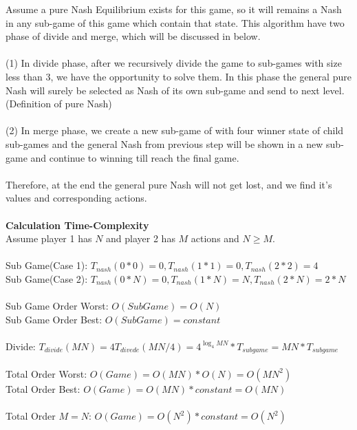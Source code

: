 \documentclass[
  course = {{IE579 Game Theory and Multi-Agent Reinforcement Learning}},
  assignment = 1,
  name = {{Mohammad Mahdi Rahimi}},
  studentnumber = {{20208244}},
  email = {{mahi@kaist.ac.kr}},
  firstexercise = 1
]{aga-homework}
\begin{document}
\proof Assume a pure Nash Equilibrium exists for this game, so it will remains a Nash in any sub-game of this game which contain that state. This algorithm have two phase of divide and merge, which will be discussed in below.\\\\
(1) In divide phase, after we recursively divide the game to sub-games with size less than 3, we have the opportunity to solve them. In this phase the general pure Nash will surely be selected as Nash of its own sub-game and send to next level. (Definition of pure Nash)
\\\\
(2) In merge phase, we create a new sub-game of with four winner state of child sub-games and the general Nash from previous step will be shown in a new sub-game and continue to winning till reach the final game.
\\\\
Therefore, at the end the general pure Nash will not get lost, and we find it's values and corresponding actions.
\\\\
\textbf{Calculation Time-Complexity}\\
Assume player 1 has $N$ and player 2 has $M$ actions and $N \ge M$.\\\\
Sub Game(Case 1): $T_{nash}(0*0) = 0, T_{nash}(1*1) = 0, T_{nash}(2*2) = 4$\\
Sub Game(Case 2): $T_{nash}(0*N) = 0, T_{nash}(1*N) = N, T_{nash}(2*N) = 2*N$\\
\\
Sub Game Order Worst: $O(SubGame) = O(N)$\\
Sub Game Order Best: $O(SubGame) = constant $\\\\
Divide: $T_{divide}(MN) = 4T_{divede}(MN/4) = 4^{\log_4{MN}}*T_{subgame} = MN*T_{subgame}$\\\\
Total Order Worst: $O(Game) =  O(MN) * O(N) = O(MN^2)$\\
Total Order Best: $O(Game) = O(MN) * constant = O(MN)$\\\\
Total Order $M = N$: $O(Game) = O(N^2) * constant = O(N^2)$\\\\
\end{document}
